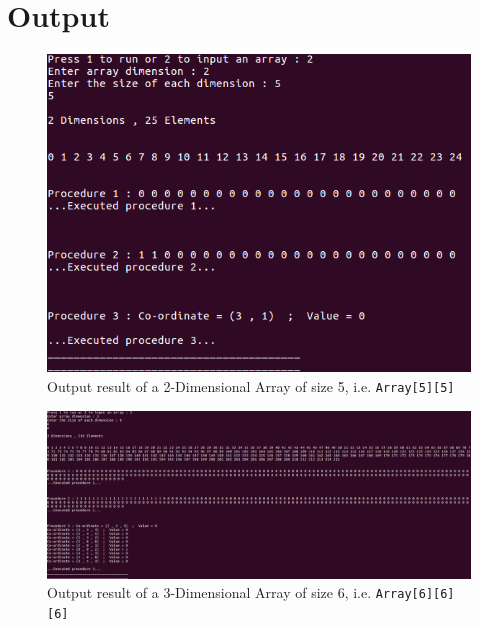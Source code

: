 \documentclass[10pt, conference]{IEEEtran}
\begin{document}
\begin{appendices}
\begin{algorithm}[h!]
\begin{algorithmic}
\end{algorithmic}
\end{algorithm}



\onecolumn
\center
\section{Output}
\label{Output}

\begin{figure}[h!]
\renewcommand{\thefigure}{\arabic{figure}}
\centering
\includegraphics[scale=0.4]{Result2D.png}
\caption{Output result of a 2-Dimensional Array of size 5, i.e. \texttt{Array[5][5]} }
\label{Result2D}
\end{figure}

\begin{figure}[h!]
\renewcommand{\thefigure}{\arabic{figure}}
\centering
\includegraphics[scale=0.3]{Result3D.png}
\caption{Output result of a 3-Dimensional Array of size 6, i.e. \texttt{Array[6][6][6]} }
\label{Result3D}
\end{figure}


\end{appendices}
\end{document}
